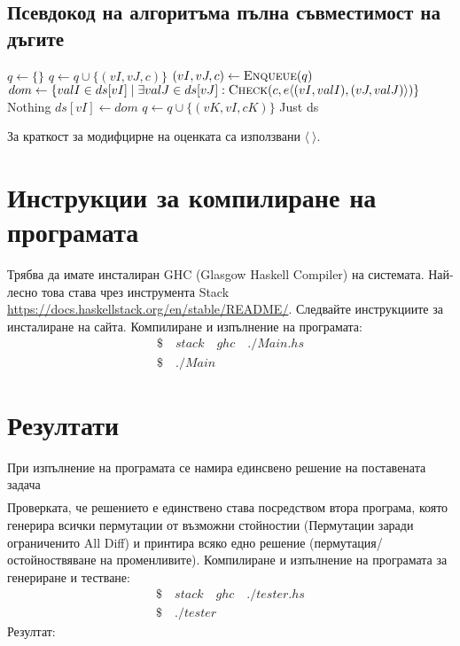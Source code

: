 \documentclass[a4paper, 12pt]{article}
\begin{document}
\subsection{Псевдокод на алгоритъма пълна съвместимост на дъгите}
\begin{algorithm}[H]
\begin{algorithmic}
    \State \(q \gets \{\}\)
            \State \(q \gets q \cup \{(vI, vJ, c)\}\)
        \EndFor
    \EndFor
        \State \((vI, vJ, c) \gets \Call{Enqueue}{q}\)
        \State \(dom \gets \{valI \in ds[vI] \; | \; \exists valJ \in ds[vJ] : \Call{Check}{c, e\langle(vI, valI), (vJ, valJ)\rangle} \}\)
            \State \Return Nothing
        \Else
            \State \(ds[vI] \gets dom\)
                    \State \(q \gets q \cup \{(vK, vI, cK)\}\)
                \EndIf
            \EndFor
        \EndIf
    \EndWhile
    \State \Return Just ds
\EndFunction
\end{algorithmic}
\end{algorithm}
За краткост за модифцирне на оценката са използвани \(\langle ~ \rangle\).
\section{Инструкции за компилиране на програмата}
Трябва да имате инсталиран GHC (Glasgow Haskell Compiler) на системата.
Най-лесно това става чрез инструмента Stack \url{https://docs.haskellstack.org/en/stable/README/}.
Следвайте инструкциите за инсталиране на сайта.
Компилиране и изпълнение на програмата:
\begin{align*}
    \$ \quad stack \quad ghc \quad ./Main.hs \\
    \$ \quad ./Main
\end{align*}
\section{Резултати}
При изпълнение на програмата се намира единсвено решение на поставената задача
\begin{align*}
    [(B,1),(A,3),(E,2),(C,7),(D,9),(F,5),(G,4),(I,6),(H,8)]
\end{align*}
Проверката, че решението е единствено става посредством втора програма,
която генерира всички пермутации от възможни стойностии (Пермутации заради ограниченито All Diff)
и принтира всяко едно решение (пермутация/остойноствяване на променливите).
Компилиране и изпълнение на програмата за генериране и тестване:
\begin{align*}
    \$ \quad stack \quad ghc \quad ./tester.hs \\
    \$ \quad ./tester
\end{align*}
Резултат:
\begin{align*}
    [('A',3),('B',1),('C',7),('D',9),('E',2),('F',5),('I',6),('G',4),('H',8)]
\end{align*}
\end{document}
